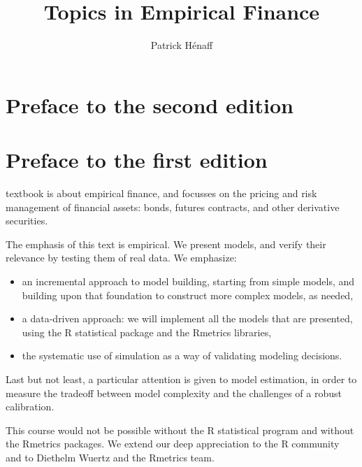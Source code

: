 \documentclass[justified]{tufte-book}
\title{Topics in Empirical Finance}
\author{Patrick Hénaff}
\date{}
\newcommand{\RR}{\textsf{R}}
\begin{document}
\maketitle



{
\setcounter{tocdepth}{0}
\tableofcontents
}

\hypertarget{preface-to-the-second-edition}{%
\chapter*{Preface to the second edition}\label{preface-to-the-second-edition}}

\hypertarget{preface-to-the-first-edition}{%
\chapter*{Preface to the first edition}\label{preface-to-the-first-edition}}

 textbook is about empirical finance, and focusses on the pricing and risk management of financial assets: bonds, futures contracts, and other derivative securities.

The emphasis of this text is empirical. We present models, and verify their relevance by testing them of real data. We emphasize:

\begin{itemize}
\item an incremental approach to model building, starting from simple models, and building upon that foundation to construct more complex models, as needed,
\item a data-driven approach: we will implement all the models that are presented, using the R statistical package and the Rmetrics libraries,
\item the systematic use of simulation as a way of validating modeling decisions.
\end{itemize}

Last but not least, a particular attention is given to model estimation, in order to measure the tradeoff between model complexity and the challenges of a robust calibration.

This course would not be possible without the \RR{} statistical program and without the Rmetrics packages. We extend our deep appreciation to the \RR{} community and to Diethelm Wuertz and the Rmetrics team.
\end{document}
